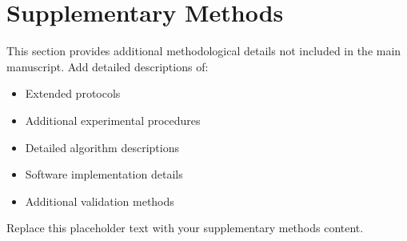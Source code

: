 
\section*{Supplementary Methods}

This section provides additional methodological details not included in the main manuscript. Add detailed descriptions of:

\begin{itemize}
    \item Extended protocols
    \item Additional experimental procedures
    \item Detailed algorithm descriptions
    \item Software implementation details
    \item Additional validation methods
\end{itemize}

Replace this placeholder text with your supplementary methods content.
